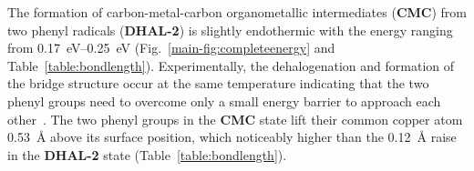 \documentclass[journal=jpclcd,layout=traditional,manuscript=letter]{achemso} %
\newcommand{\zhzh}{\color{blue}}
\begin{document}


The formation of carbon-metal-carbon organometallic intermediates (\textbf{CMC}) from two phenyl radicals (\textbf{DHAL-2}) is slightly endothermic with the energy ranging from \SIrange{0.17}{0.25}{\electronvolt} (Fig.~\ref{main-fig:completeenergy} and Table~\ref{table:bondlength}). Experimentally, the dehalogenation and formation of the bridge structure occur at the same temperature indicating that the two phenyl groups need to overcome only a small energy barrier to approach each other~\cite{ullmann_88}. 
%
The two phenyl groups in the \textbf{CMC} state lift their common copper atom \SI{0.53}{\angstrom} above its surface position, which noticeably higher than the \SI{0.12}{\angstrom} raise in the \textbf{DHAL-2} state (Table~\ref{table:bondlength}).
\end{document}
